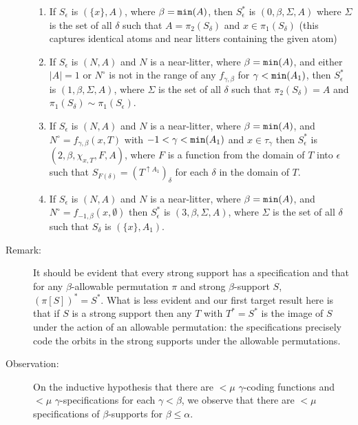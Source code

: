 \documentclass[112pt]{article}
\begin{document}
\begin{description}
\begin{enumerate}

\item  If $S_{\epsilon}$ is $(\{x\},A)$, where $\beta={\tt min}(A)$, then $S^*_\epsilon$ is $(0,\beta,\Sigma,A)$ where  $\Sigma$ is the set of all $\delta$ such that $A=\pi_2(S_\delta)$ and $x \in  \pi_1(S_\delta)$ (this captures identical atoms and near litters containing the given atom)

\item  If $S_\epsilon$ is $(N,A)$ and $N$ is a near-litter, where $\beta={\tt min}(A)$, and either $|A|=1$ or $N^\circ$ is not in the range of any $f_{\gamma,\beta}$ for $\gamma<{\tt min}(A_1)$, then $S^*_\epsilon$ is $(1,\beta,\Sigma,A)$, where $\Sigma$ is the set of all $\delta$ such that $\pi_2(S_\delta) = A$
and $\pi_1(S_\delta) \sim \pi_1(S_\epsilon)$.

\item  If $S_\epsilon$ is $(N,A)$ and $N$ is a near-litter, where $\beta={\tt min}(A)$, and $N^\circ=f_{\gamma,\beta}(x,T)$ with $-1<\gamma<{\tt min}(A_1)$ and $x\in \tau_\gamma$ then 
$S^*_\epsilon$ is $(2,\beta,\chi_{x,T},F,A)$, where $F$ is a function from the domain of $T$ into $\epsilon$
such that $S_{F(\delta)} = (T^{\uparrow A_1})_\delta$ for each $\delta$ in the domain of $T$.

\item  If $S_\epsilon$ is $(N,A)$ and $N$ is a near-litter, where $\beta={\tt min}(A)$, and $N^\circ=f_{-1,\beta}(x,\emptyset)$  then $S^*_\epsilon$ is $(3,\beta,\Sigma,A)$, where  $\Sigma$ is the set of all $\delta$ such that $S_\delta$ is $(\{x\},A_1)$.

\end{enumerate}



\item[Remark:]  It should be evident that every strong support has a specification and that for any $\beta$-allowable permutation $\pi$ and strong $\beta$-support $S$,
$(\pi[S])^* = S^*$.  What is less evident and our first target result here is that if $S$ is a strong support then any $T$ with $T^* = S^*$ is the image of $S$ under the action of an allowable permutation:  the specifications precisely code the orbits in the strong supports under the allowable permutations.

\item[Observation:]  On the inductive hypothesis that there are $<\mu$ $\gamma$-coding functions and $<\mu$ $\gamma$-specifications for each $\gamma<\beta$, we observe that there are $<\mu$ specifications of $\beta$-supports for $\beta\leq \alpha$.


\end{description}
\end{document}
